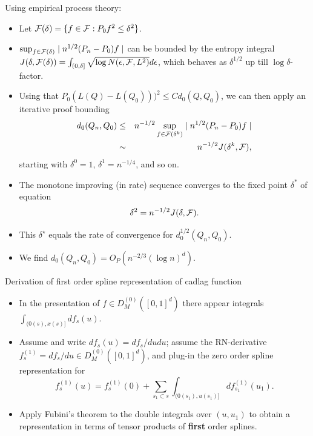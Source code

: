 \documentclass[t]{beamer}
\begin{document}
\begin{frame}{Using empirical process theory:}
\begin{itemize}
\item Let ${\cal F}(\delta)=\{f\in {\cal F}: P_0f^2\leq \delta^2\}$.
\item $\sup_{f\in {\cal F}(\delta)}\mid n^{1/2}(P_n-P_0)f\mid$ can be bounded by  the entropy integral
$J(\delta,{\cal F}(\delta))=\int_{(0,\delta]}\sqrt{\log N(\epsilon,{\cal F},L^2)} d\epsilon$, which behaves as $\delta^{1/2}$ up till $\log \delta$-factor.
\item Using that $P_0(L(Q)-L(Q_0)))^2\leq C d_0(Q,Q_0)$, we can then apply an iterative proof bounding
\begin{eqnarray}
d_0(Q_n,Q_0)&\leq& n^{-1/2}\sup_{f\in {\cal F}(\delta^k)}\mid n^{1/2}(P_n-P_0)f\mid\\
&\sim & n^{-1/2} J(\delta^k,{\cal F}),
\end{eqnarray}
 starting with $\delta^0=1$, $\delta^1=n^{-1/4}$, and so on.
  \end{itemize}
 \end{frame}
 \begin{frame}
 \begin{itemize}
 \item The monotone improving (in rate) sequence converges to the fixed point $\delta^*$ of equation
 \[
 \delta^2=n^{-1/2}J(\delta,{\cal F}).\]
 \item
This $\delta^{\star}$ equals the rate of convergence for $d_0^{1/2}(Q_n,Q_0)$.
\item We find $d_0(Q_n,Q_0)=O_P(n^{-2/3}(\log n)^d)$.
\end{itemize}
\end{frame}

\begin{frame}{Derivation of first order spline representation of cadlag function}
\begin{itemize}
\item In the presentation of $f\in D^{(0)}_M([0,1]^d)$ there appear integrals
$\int_{(0(s),x(s)]} df_s(u)$.
\item Assume and write $df_s(u)=df_s/du du$; assume the RN-derivative $f_s^{(1)}=df_s/du\in D^{(0)}_M([0,1]^d)$, and plug-in the zero order spline representation for
\[
  f_s^{(1)}(u)=f_s^{(1)}(0)+\sum_{s_1\subset s}\int_{(0(s_1),u(s_1)]}
  df_{s_1}^{(1)}(u_1).
\]
\item Apply Fubini's theorem to the double integrals over $(u,u_1)$ to obtain
a representation in terms of tensor products of {\bf first} order splines.
\end{itemize}
\end{frame}
\end{document}
